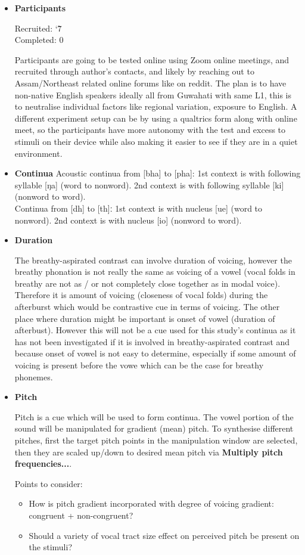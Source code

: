 \documentclass[12pt, english]{article}
\begin{document}
\begin{itemize}
    \item \textbf{Participants} \par
    Recruited: \char`\~ 7 \\
    Completed: 0 \par
    Participants are going to be tested online using Zoom online meetings, and recruited through author's contacts, and likely by reaching out to Assam/Northeast related online forums like on reddit. The plan is to have non-native English speakers ideally all from Guwahati with same L1, this is to neutralise individual factors like regional variation, exposure to English. A different experiment setup can be by using a qualtrics form along with online meet, so the participants have more autonomy with the test and excess to stimuli on their device while also making it easier to see if they are in a quiet environment. \par
    \item \textbf{Continua}
    Acoustic continua from [bha] to [pha]: 1st context is with following syllable [ŋa] (word to nonword). 2nd context is with following syllable [ki] (nonword to word). \\
    Continua from [dh] to [th]ː 1st context is with nucleus [ue] (word to nonword). 2nd context is with nucleus [io] (nonword to word). \par
    \item \textbf{Duration} \par
    The breathy-aspirated contrast can involve duration of voicing, however the breathy phonation is not really the same as voicing of a vowel (vocal folds in breathy are not as / or not completely close together as in modal voice). Therefore it is amount of voicing (closeness of vocal folds) during the afterburst which would be contrastive cue in terms of voicing. The other place where duration might be important is onset of vowel (duration of afterbust). However this will not be a cue used for this study's continua as it has not been investigated if it is involved in breathy-aspirated contrast and because onset of vowel is not easy to determine, especially if some amount of voicing is present before the vowe which can be the case for breathy phonemes.  \par
    \item \textbf{Pitch} \par
    Pitch is a cue which will be used to form continua. The vowel portion of the sound will be manipulated for gradient (mean) pitch. To synthesise different pitches, first the target pitch points in the manipulation window are selected, then they are scaled up/down to desired mean pitch via \textbf{Multiply pitch frequencies...}. \par
    Points to consider:
    \begin{itemize}
        \item How is pitch gradient incorporated with degree of voicing gradient: congruent + non-congruent?
        \item Should a variety of vocal tract size effect on perceived pitch be present on the stimuli? 
    \end{itemize}
\end{itemize}

\end{document}
